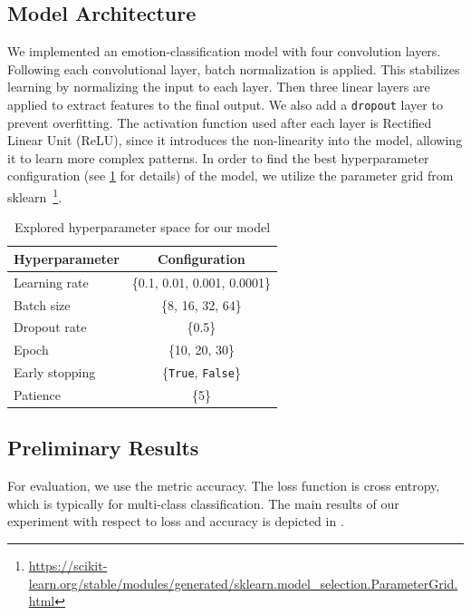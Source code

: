 \subsection{Model Architecture}
We implemented an emotion-classification model with four convolution layers. 
Following each convolutional layer, 
batch normalization is applied. 
This stabilizes learning by normalizing the input to each layer. 
Then three linear layers are applied to extract features to the final output. 
We also add a \texttt{dropout} layer to prevent overfitting. 
The activation function used after each layer is Rectified Linear Unit (ReLU), 
since it introduces the non-linearity into the model, 
allowing it to learn more complex patterns. 
In order to find the best hyperparameter configuration (see \cref{tab:hyper} for details) of the model, 
we utilize the parameter grid from sklearn~\footnote{\url{https://scikit-learn.org/stable/modules/generated/sklearn.model_selection.ParameterGrid.html}}. 


\begin{table}
    \centering
    \begin{tabular}{@{}lc@{}}
      \toprule
      Hyperparameter & Configuration \\
      \midrule
      Learning rate & \{0.1, 0.01, 0.001, 0.0001\}  \\
      Batch size & \{8, 16, 32, 64\} \\
      Dropout rate & \{0.5\} \\
      Epoch & \{10, 20, 30\} \\
      Early stopping & \{\texttt{True}, \texttt{False}\} \\
      Patience & \{5\} \\
      \bottomrule
    \end{tabular}
    \caption{Explored hyperparameter space for our model}
    \label{tab:hyper}
  \end{table}

\subsection{Preliminary Results}

For evaluation, we use the metric accuracy. 
The loss function is cross entropy, which is typically for multi-class classification. 
The main results of our experiment with respect to loss and accuracy is depicted in .


